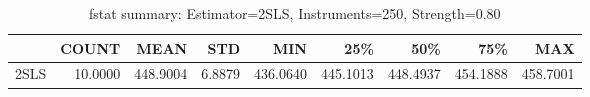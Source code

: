 \begin{table}[ht]
\centering
\caption{fstat summary: Estimator=2SLS, Instruments=250, Strength=0.80}
\begin{tabular}{lrrrrrrrr}
\toprule
 & COUNT & MEAN & STD & MIN & 25\% & 50\% & 75\% & MAX \\
\midrule
2SLS & 10.0000 & 448.9004 & 6.8879 & 436.0640 & 445.1013 & 448.4937 & 454.1888 & 458.7001 \\
\bottomrule
\end{tabular}
\end{table}
